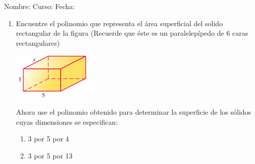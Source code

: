 \documentclass[letterpaper,fleqn]{article}
\newcommand{\LineaNombre}{%
\par
\vspace{\baselineskip}
Nombre:\hrulefill \; Curso: \underline{\hspace*{48pt}} \; Fecha: \underline{\hspace*{2.5cm}} \relax
\par}
\begin{document}
\LineaNombre
\begin{enumerate}
 \item Encuentre el polinomio que representa el área superficial del solido rectangular de la figura (Recuerde que \'{e}ste es un paralelep\'{i}pedo de 6 caras rectangulares)
\begin{center}
\includegraphics[scale=1]{Images/solido01.png} 
\end{center}
Ahora use el polinomio obtenido para determinar la superficie de los sólidos cuyas dimensiones se especifican:
\begin{enumerate}
\item 3 por 5 por 4
\item 3 por 5 por 13
\end{enumerate}
 \end{enumerate}
\end{document}
